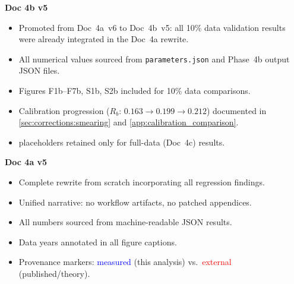 \documentclass[11pt,a4paper]{article}
\newcommand{\tbd}[1]{\textcolor{gray}{\textit{#1}}}
\newcommand{\measured}[1]{\textcolor{blue}{#1}}
\newcommand{\external}[1]{\textcolor{red}{#1}}
\begin{document}
\textbf{Doc 4b v5}
\begin{itemize}
\item Promoted from Doc~4a~v6 to Doc~4b~v5: all 10\% data validation
  results were already integrated in the Doc~4a rewrite.
\item All numerical values sourced from \texttt{parameters.json} and
  Phase~4b output JSON files.
\item Figures F1b--F7b, S1b, S2b included for 10\% data comparisons.
\item Calibration progression ($R_b$: $0.163 \to 0.199 \to 0.212$)
  documented in \cref{sec:corrections:smearing} and \cref{app:calibration_comparison}.
\item \tbd{} placeholders retained only for full-data (Doc~4c) results.
\end{itemize}

\textbf{Doc 4a v5}
\begin{itemize}
\item Complete rewrite from scratch incorporating all regression findings.
\item Unified narrative: no workflow artifacts, no patched appendices.
\item All numbers sourced from machine-readable JSON results.
\item Data years annotated in all figure captions.
\item Provenance markers: \measured{measured} (this analysis) vs.\ \external{external} (published/theory).
\end{itemize}
\end{document}
